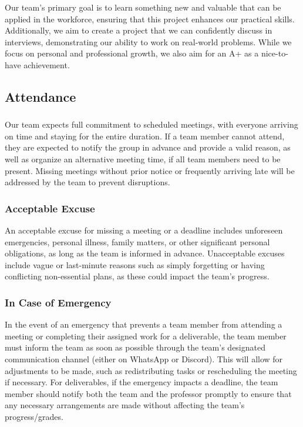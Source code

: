 \documentclass{article}
\begin{document}
Our team's primary goal is to learn something new and valuable that
can be applied in the workforce,
ensuring that this project enhances our practical skills.
Additionally, we aim to create a project
that we can confidently discuss in interviews, demonstrating our
ability to work on real-world
problems. While we focus on personal and professional growth, we also
aim for an A+ as a
nice-to-have achievement.

\subsection*{Attendance}

\subsubsection*{\color{blue}{Expectations}}

Our team expects full commitment to scheduled meetings, with everyone
arriving on time and staying
for the entire duration. If a team member cannot attend, they are
expected to notify the group in
advance and provide a valid reason, as well as organize an
alternative meeting time, if all team
members need to be present. Missing meetings without prior notice or
frequently arriving late
will be addressed by the team to prevent disruptions.

\subsubsection*{\color{blue}Acceptable Excuse}

An acceptable excuse for missing a meeting or a deadline includes
unforeseen emergencies, personal
illness, family matters, or other significant personal obligations,
as long as the team is
informed in advance. Unacceptable excuses include vague or
last-minute reasons such as simply
forgetting or having conflicting non-essential plans, as these could
impact the team's progress.

\subsubsection*{\color{blue}In Case of Emergency}

In the event of an emergency that prevents a team member from
attending a meeting or completing
their assigned work for a deliverable, the team member must inform
the team as soon as possible
through the team's designated communication channel (either on
WhatsApp or Discord). This will
allow for adjustments to be made, such as redistributing tasks or
rescheduling the meeting if
necessary. For deliverables, if the emergency impacts a deadline, the
team member should notify
both the team and the professor promptly to ensure that any necessary
arrangements are made
without affecting the team's progress/grades.
\end{document}
